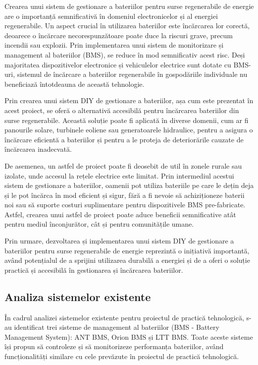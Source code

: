 Crearea unui sistem de gestionare a bateriilor pentru surse regenerabile de energie are o importanță semnificativă în domeniul electronicelor și al energiei regenerabile. Un aspect crucial în utilizarea bateriilor este încărcarea lor corectă, deoarece o încărcare necorespunzătoare poate duce la riscuri grave, precum incendii sau explozii. Prin implementarea unui sistem de monitorizare și management al bateriilor (BMS), se reduce în mod semnificativ acest risc. Deși majoritatea dispozitivelor electronice și vehiculelor electrice sunt dotate cu BMS-uri, sistemul de încărcare a bateriilor regenerabile în gospodăriile individuale nu beneficiază întotdeauna de această tehnologie.

Prin crearea unui sistem DIY de gestionare a bateriilor, așa cum este prezentat în acest proiect, se oferă o alternativă accesibilă pentru încărcarea bateriilor din surse regenerabile. Această soluție poate fi aplicată în diverse domenii, cum ar fi panourile solare, turbinele eoliene sau generatoarele hidraulice, pentru a asigura o încărcare eficientă a bateriilor și pentru a le proteja de deteriorările cauzate de încărcarea inadecvată.

De asemenea, un astfel de proiect poate fi deosebit de util în zonele rurale sau izolate, unde accesul la rețele electrice este limitat. Prin intermediul acestui sistem de gestionare a bateriilor, oamenii pot utiliza bateriile pe care le dețin deja și le pot încărca în mod eficient și sigur, fără a fi nevoie să achiziționeze baterii noi sau să suporte costuri suplimentare pentru dispozitivele BMS pre-fabricate. Astfel, crearea unui astfel de proiect poate aduce beneficii semnificative atât pentru mediul înconjurător, cât și pentru comunitățile umane.

Prin urmare, dezvoltarea și implementarea unui sistem DIY de gestionare a bateriilor pentru surse regenerabile de energie reprezintă o inițiativă importantă, având potențialul de a sprijini utilizarea durabilă a energiei și de a oferi o soluție practică și accesibilă în gestionarea și încărcarea bateriilor.

\subsection{Analiza sistemelor existente}

În cadrul analizei sistemelor existente pentru proiectul de practică tehnologică, s-au identificat trei sisteme de management al bateriilor (BMS - Battery Management System): ANT BMS, Orion BMS și LTT BMS. Toate aceste sisteme își propun să controleze și să monitorizeze performanța bateriilor, având funcționalități similare cu cele prevăzute în proiectul de practică tehnologică.

